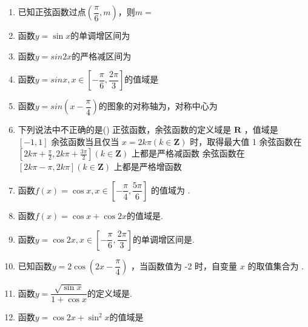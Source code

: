 \begin{enumerate}
    \item 已知正弦函数过点$\left(\dfrac{\pi}{6}, m\right)$，则$m = $
    \item 函数$y=\sin{x}$的单调增区间为
    \item 函数$y = sin2x$的严格减区间为
    \item 函数$y = sinx, x \in \left[-\dfrac{\pi}{6}, \dfrac{2\pi}{3}\right]$的值域是
    \item 函数$y = sin\left(x - \dfrac{\pi}{4}\right)$的图象的对称轴为，对称中心为    

    \item 下列说法中不正确的是\dotfill()
    \xx
    {正弦函数，余弦函数的定义域是 $\mathbf{R}$ ，值域是 $[-1,1]$}
    {余弦函数当且仅当 $x=2 k \pi(k \in \mathbf{Z})$ 时，取得最大值 1}
    {余弦函数在 $\left[2 k \pi+\frac{\pi}{2}, 2 k \pi+\frac{3 \pi}{2}\right](k \in \mathbf{Z})$ 上都是严格减函数}
    {余弦函数在 $[2 k \pi-\pi, 2 k \pi](k \in \mathbf{Z})$ 上都是严格增函数}
    
    \item 函数$f(x)=\cos x, x \in \left[-\dfrac{\pi}{4}, \dfrac{5 \pi}{6}\right]$ 的值域为 .

    \item 函数$f(x)=\cos{x}+\cos{2x}$的值域是.

    \item 函数$y=\cos{2x},x\in \left[-\dfrac{\pi}{6},\dfrac{2\pi}{3}\right]$的单调增区间是.

    \item 已知函数$y = 2\cos \left(2 x-\dfrac{\pi}{4}\right)$  ，当函数值为 -2 时，自变量 $x$ 的取值集合为 .

    \item 函数$y=\dfrac{\sqrt{\sin{x}}}{1+\cos{x}}$的定义域是\blkda[4]{$[2k\pi,2k\pi+\pi)(k\zz)$}. 

    \item 函数$y=\cos2x+\sin^2x$的值域是\blkda{$[0,1]$}
    

\end{enumerate}

